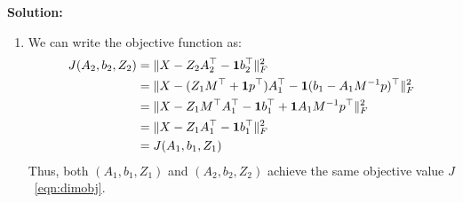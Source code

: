 \documentclass[a4paper]{article}
\newcommand*{\one}{{\bf 1}}
\theoremstyle{definition}
\begin{document}
\textbf{Solution: }
\begin{enumerate}
    \item We can write the objective function as:
    \begin{align*}
        J(A_2, b_2, Z_2) &= \| X - Z_2A_2^\top - \one b_2^\top\|_F^2\\
        &= \| X - (Z_1 M^\top + \one p^\top)A_1^\top - \one (b_1- A_1M^{-1}p)^\top\|_F^2\\
        &= \| X - Z_1M^\top A_1^\top - \one b_1^\top + \one A_1M^{-1}p^\top\|_F^2\\
        &= \| X - Z_1A_1^\top - \one b_1^\top\|_F^2\\
        &= J(A_1, b_1, Z_1)
    \end{align*}
    Thus, both $(A_1, b_1, Z_1)$ and $(A_2, b_2, Z_2)$ achieve the same objective value $J$~\eqref{eqn:dimobj}.


\end{enumerate}
\end{document}
